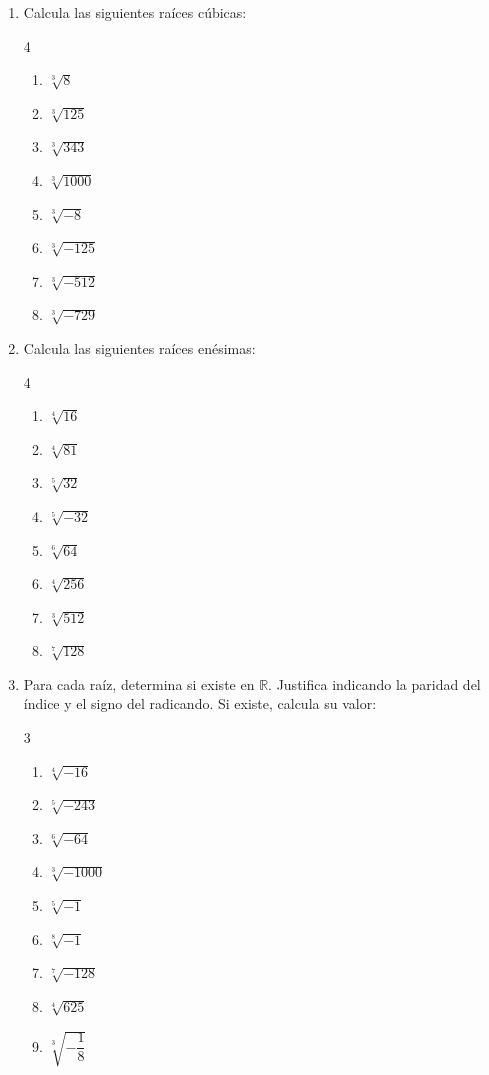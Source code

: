 \documentclass[11pt, letterpaper]{article}
\begin{document}
\begin{enumerate}[label=\textbf{\arabic*.}, leftmargin=*]
  \item Calcula las siguientes raíces cúbicas:
  \begin{multicols}{4}
  \begin{enumerate}[label=\alph*)]
    \item $\sqrt[3]{8}$
    \item $\sqrt[3]{125}$
    \item $\sqrt[3]{343}$
    \item $\sqrt[3]{1000}$
    \item $\sqrt[3]{-8}$
    \item $\sqrt[3]{-125}$
    \item $\sqrt[3]{-512}$
    \item $\sqrt[3]{-729}$
  \end{enumerate}
  \end{multicols}

  \item Calcula las siguientes raíces enésimas:
  \begin{multicols}{4}
  \begin{enumerate}[label=\alph*)]
    \item $\sqrt[4]{16}$
    \item $\sqrt[4]{81}$
    \item $\sqrt[5]{32}$
    \item $\sqrt[5]{-32}$
    \item $\sqrt[6]{64}$
    \item $\sqrt[4]{256}$
    \item $\sqrt[3]{512}$
    \item $\sqrt[7]{128}$
  \end{enumerate}
  \end{multicols}

  \item Para cada raíz, determina si existe en $\mathbb{R}$. Justifica indicando la paridad del índice y el signo del radicando. Si existe, calcula su valor:
  \begin{multicols}{3}
  \begin{enumerate}[label=\alph*)]
    \item $\sqrt[4]{-16}$
    \item $\sqrt[5]{-243}$
    \item $\sqrt[6]{-64}$
    \item $\sqrt[3]{-1000}$
    \item $\sqrt[5]{-1}$
    \item $\sqrt[8]{-1}$
    \item $\sqrt[7]{-128}$
    \item $\sqrt[4]{625}$
    \item $\sqrt[3]{-\dfrac{1}{8}}$
  \end{enumerate}
  \end{multicols}


\end{enumerate}
\end{document}

